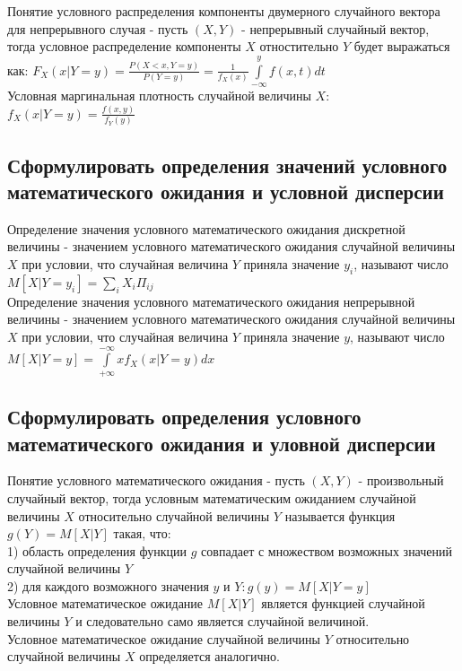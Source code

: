 Понятие условного распределения компоненты двумерного случайного вектора для непрерывного случая - пусть $(X, Y)$ - непрерывный случайный вектор, тогда условное распределение компоненты $X$ отностительно $Y$ будет выражаться как: $F_{X}(x| Y = y) = \frac{P(X < x, Y = y)}{P(Y = y)} = \frac{1}{f_{X}(x)}\int\limits_{-\infty}^{y} f(x, t) dt$\\
Условная маргинальная плотность случайной величины $X$: $f_{X}(x | Y = y) = \frac{f(x, y)}{f_{Y}(y)}$

\subsection{Сформулировать определения значений условного математического ожидания и условной дисперсии}
Определение значения условного математического ожидания дискретной величины - значением условного математического ожидания случайной величины $X$ при условии, что случайная величина $Y$ приняла значение $y_{i}$, называют число $M[X | Y = y_{i}] = \sum\limits_{i} X_{i} \Pi_{ij}$\\

Определение значения условного математического ожидания непрерывной величины - значением условного математического ожидания случайной величины $X$ при условии, что случайная величина $Y$ приняла значение $y$, называют число $M[X | Y = y] = \int\limits_{+\infty}^{-\infty} x f_{X} (x | Y = y) dx$\\

\subsection{Сформулировать определения условного математического ожидания и уловной дисперсии}

Понятие условного математического ожидания - пусть $(X, Y)$ - произвольный случайный вектор, тогда условным математическим ожиданием случайной величины $X$ относительно случайной величины $Y$ называется функция $g(Y) = M[X|Y]$ такая, что:\\
1) область определения функции $g$ совпадает с множеством возможных значений случайной величины $Y$\\
2) для каждого возможного значения $y$ и $Y: g(y) = M[X | Y = y]$\\

Условное математическое ожидание $M[X|Y]$ является функцией случайной величины $Y$ и следовательно само является случайной величиной.\\
Условное математическое ожидание случайной величины $Y$ относительно случайной величины $X$ определяется аналогично.\\

